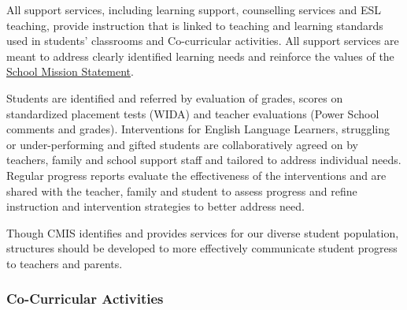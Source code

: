 
\begin{findings}
All support services, including learning support, counselling services and ESL teaching, provide instruction that is linked to teaching and learning standards used in students’ classrooms and Co-curricular activities. All support services are meant to address clearly identified learning needs and reinforce the values of the \href{http://cmis.ac.th/about/vision}{School Mission Statement}. 

Students are identified and referred by evaluation of grades, scores on standardized placement tests (WIDA) and teacher evaluations (Power School comments and grades).  Interventions for English Language Learners, struggling or under-performing and gifted students are collaboratively agreed on by teachers, family and school support staff and tailored to address individual needs. Regular progress reports evaluate the effectiveness of the interventions and are shared with the teacher, family and student to assess progress and refine instruction and intervention strategies to better address need.


Though CMIS identifies and provides services for our diverse student population, structures should be developed to more effectively communicate student progress to teachers and parents. 
\end{findings}

\subsubsection{Co-Curricular Activities}



